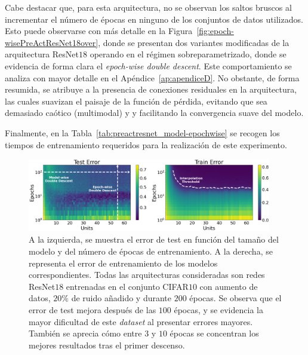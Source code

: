 Cabe destacar que, para esta arquitectura, no se observan los saltos bruscos al incrementar el número de épocas en ninguno de los conjuntos de datos utilizados. Esto puede observarse con más detalle en la Figura~\ref{fig:epoch-wisePreActResNet18over}, donde se presentan dos variantes modificadas de la arquitectura ResNet$18$ operando en el régimen sobreparametrizado, donde se evidencia de forma clara el \textit{epoch-wise double descent}. Este comportamiento se analiza con mayor detalle en el Apéndice~\ref{ap:apendiceD}. No obstante, de forma resumida, se atribuye a la presencia de conexiones residuales en la arquitectura, las cuales suavizan el paisaje de la función de pérdida, evitando que sea demasiado caótico (multimodal) y y facilitando la convergencia suave del modelo.

Finalmente, en la Tabla~\ref{tab:preactresnet_model-epochwise} se recogen los tiempos de entrenamiento requeridos para la realización de este experimento.

\begin{figure}[h]
    \centering
    \includegraphics[width=0.95\textwidth]{img/experiments/model-epochPreActResNet18CIFAR10augmented.png}
    \caption[Doble descenso en función del tamaño del modelo y del número de épocas para la red ResNet$18$ y el conjunto CIFAR$10$.]{A la izquierda, se muestra el error de test en función del tamaño del modelo y del número de épocas de entrenamiento. A la derecha, se representa el error de entrenamiento de los modelos correspondientes. Todas las arquitecturas consideradas son redes ResNet$18$ entrenadas en el conjunto CIFAR$10$ con aumento de datos\protect\footnotemark, $20\%$ de ruido añadido y durante $200$ épocas. Se observa que el error de test mejora después de las $100$ épocas, y se evidencia la mayor dificultad de este \textit{dataset} al presentar errores mayores. También se aprecia cómo entre $3$ y $10$ épocas se concentran los mejores resultados tras el primer descenso.}\label{fig:model-epochPreActResNet18CIFAR10}
\end{figure}

